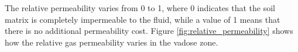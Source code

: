 The relative permeability varies from 0 to 1, where 0 indicates that the soil matrix is completely impermeable to the fluid, while a value of 1 means that there is no additional permeability cost.
Figure \ref{fig:relative_permeability} shows how the relative gas permeability varies in the vadose zone.\par
